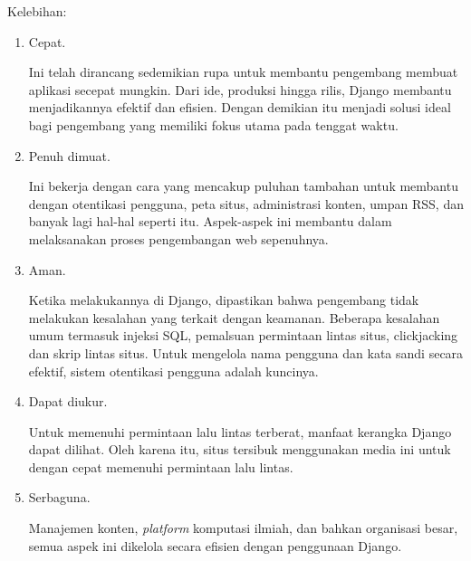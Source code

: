 Kelebihan:
\begin{enumerate}
\item Cepat.

Ini telah dirancang sedemikian rupa untuk membantu pengembang membuat aplikasi secepat mungkin. Dari ide, produksi hingga rilis, Django membantu menjadikannya efektif dan efisien. Dengan demikian itu menjadi solusi ideal bagi pengembang yang memiliki fokus utama pada tenggat waktu.

\item Penuh dimuat.

Ini bekerja dengan cara yang mencakup puluhan tambahan untuk membantu dengan otentikasi pengguna, peta situs, administrasi konten, umpan RSS, dan banyak lagi hal-hal seperti itu. Aspek-aspek ini membantu dalam melaksanakan proses pengembangan web sepenuhnya.

\item Aman.

Ketika melakukannya di Django, dipastikan bahwa pengembang tidak melakukan kesalahan yang terkait dengan keamanan. Beberapa kesalahan umum termasuk injeksi SQL, pemalsuan permintaan lintas situs, clickjacking dan skrip lintas situs. Untuk mengelola nama pengguna dan kata sandi secara efektif, sistem otentikasi pengguna adalah kuncinya.

\item Dapat diukur.

Untuk memenuhi permintaan lalu lintas terberat, manfaat kerangka Django dapat dilihat. Oleh karena itu, situs tersibuk menggunakan media ini untuk dengan cepat memenuhi permintaan lalu lintas.

\item Serbaguna.

Manajemen konten,\textit{ platform} komputasi ilmiah, dan bahkan organisasi besar, semua aspek ini dikelola secara efisien dengan penggunaan Django.


\end{enumerate}

